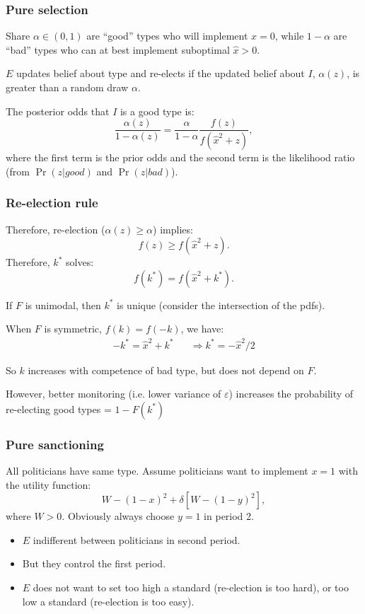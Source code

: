 \documentclass[10pt]{beamer}
\begin{document}
\begin{frame}

\frametitle{Pure selection}

Share $\alpha\in(0,1)$ are ``good'' types who will implement $x=0$, while $1-\alpha$ are ``bad'' types who can at best implement suboptimal $\hat{x}>0$. 

\bigskip

$E$ updates belief about type and re-elects if the updated belief about $I$, $\alpha(z)$, is greater than a random draw $\alpha$. 

\bigskip

The posterior odds that $I$ is a good type is: $$\frac{\alpha(z)}{1-\alpha(z)} = \frac{\alpha}{1-\alpha}\frac{f(z)}{f(\hat{x}^2+z)},$$ where the first term is the prior odds and the second term is the likelihood ratio (from $\Pr(z|good)$ and $\Pr(z|bad)$).




\end{frame}

\begin{frame}

\frametitle{Re-election rule}

Therefore, re-election ($\alpha(z)\geq \alpha$) implies: $$f(z)\geq f(\hat{x}^2+z).$$ Therefore, $k^*$ solves: $$f(k^*) = f(\hat{x}^2+k^*).$$

If $F$ is unimodal, then $k^*$ is unique (consider the intersection of the pdfs). 

When $F$ is symmetric, $f(k) = f(-k)$, we have: \begin{eqnarray*}
-k^* = \hat{x}^2 + k^* \hspace{20pt}
\Longrightarrow k^* = -\hat{x}^2/2
\end{eqnarray*}

So $k$ increases with competence of bad type, but does not depend on $F$. 

\smallskip

However, better monitoring (i.e. lower variance of $\varepsilon$) increases the probability of re-electing good types = $1-F(k^*)$ 

\end{frame}

\begin{frame}

\frametitle{Pure sanctioning}

All politicians have same type. Assume politicians want to implement $x=1$ with the utility function: $$W - (1-x)^2 + \delta [W - (1-y)^2],$$ where $W>0$. Obviously always choose $y=1$ in period 2.

\bigskip

\begin{itemize}
\item $E$ indifferent between politicians in second period. 
\item But they control the first period. 
\item $E$ does not want to set too high a standard (re-election is too hard), or too low a standard (re-election is too easy). 
\end{itemize}

\end{frame}
\end{document}
